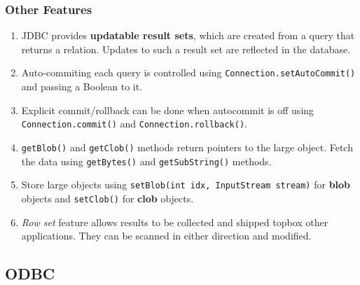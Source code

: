 \documentclass[journal,12pt,twocolumn]{IEEEtran}
\begin{document}
\subsubsection{Other Features}

\begin{enumerate}
     \item JDBC provides \textbf{updatable result sets}, which are created from a query
     that returns a relation. Updates to such a result set are reflected in the database.
     \item Auto-commiting each query is controlled using \texttt{Connection.setAutoCommit()} 
     and passing a Boolean to it.
     \item Explicit commit/rollback can be done when autocommit is off using 
     \texttt{Connection.commit()} and \texttt{Connection.rollback()}.
     \item \texttt{getBlob()} and \texttt{getClob()} methods return pointers
     to the large object. Fetch the data using \texttt{getBytes()} and
     \texttt{getSubString()} methods.
     \item Store large objects using \texttt{setBlob(int idx, InputStream stream)}
     for \textbf{blob} objects and \texttt{setClob()} for \textbf{clob} 
     objects.
     \item \textit{Row set} feature allows results to be collected and shipped topbox
     other applications. They can be scanned in either direction and modified.
\end{enumerate}

\subsection{ODBC}
\end{document}
